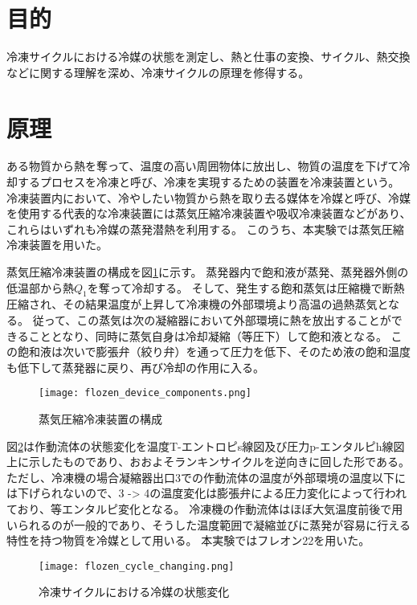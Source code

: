 \documentclass{jarticle}
\begin{document}
\section{目的}
	冷凍サイクルにおける冷媒の状態を測定し、熱と仕事の変換、サイクル、熱交換などに関する理解を深め、冷凍サイクルの原理を修得する。

\section{原理}
	ある物質から熱を奪って、温度の高い周囲物体に放出し、物質の温度を下げて冷却するプロセスを冷凍と呼び、冷凍を実現するための装置を冷凍装置という。
	冷凍装置内において、冷やしたい物質から熱を取り去る媒体を冷媒と呼び、冷媒を使用する代表的な冷凍装置には蒸気圧縮冷凍装置や吸収冷凍装置などがあり、これらはいずれも冷媒の蒸発潜熱を利用する。
	このうち、本実験では蒸気圧縮冷凍装置を用いた。
	\par 蒸気圧縮冷凍装置の構成を図\ref{fig:flozen_device_components}に示す。
	蒸発器内で飽和液が蒸発、蒸発器外側の低温部から熱$Q_1$を奪って冷却する。
	そして、発生する飽和蒸気は圧縮機で断熱圧縮され、その結果温度が上昇して冷凍機の外部環境より高温の過熱蒸気となる。
	従って、この蒸気は次の凝縮器において外部環境に熱を放出することができることとなり、同時に蒸気自身は冷却凝縮（等圧下）して飽和液となる。
	この飽和液は次いで膨張弁（絞り弁）を通って圧力を低下、そのため液の飽和温度も低下して蒸発器に戻り、再び冷却の作用に入る。

	\begin{figure}[H]
		\centering
		\hspace{-2cm}
		\vspace{0cm}
		\texttt{[image: flozen\_device\_components.png]}
		\caption{蒸気圧縮冷凍装置の構成}
		\label{fig:flozen_device_components}
	\end{figure}

	\par 図\ref{fig:flozen_cycle_changing}は作動流体の状態変化を温度T-エントロピs線図及び圧力p-エンタルピh線図上に示したものであり、おおよそランキンサイクルを逆向きに回した形である。
	ただし、冷凍機の場合凝縮器出口3での作動流体の温度が外部環境の温度以下には下げられないので、3 -> 4の温度変化は膨張弁による圧力変化によって行われており、等エンタルピ変化となる。
	冷凍機の作動流体はほぼ大気温度前後で用いられるのが一般的であり、そうした温度範囲で凝縮並びに蒸発が容易に行える特性を持つ物質を冷媒として用いる。
	本実験ではフレオン22を用いた。

	\begin{figure}[H]
		\centering
		\hspace{-2cm}
		\vspace{0cm}
		\texttt{[image: flozen\_cycle\_changing.png]}
		\caption{冷凍サイクルにおける冷媒の状態変化}
		\label{fig:flozen_cycle_changing}
	\end{figure}
\end{document}
